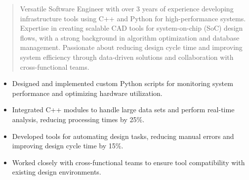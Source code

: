 



\makecvheader

\begin{quote}
  \noindent
  Versatile Software Engineer with over 3 years of experience developing infrastructure tools using C++ and Python for high-performance systems. Expertise in creating scalable CAD tools for system-on-chip (SoC) design flows, with a strong background in algorithm optimization and database management. Passionate about reducing design cycle time and improving system efficiency through data-driven solutions and collaboration with cross-functional teams.
\end{quote}

\par\smallskip
\noindent
\begin{minipage}{20cm}
  \begin{minipage}{9.75cm}
    \begin{itemize}
      \item Designed and implemented custom Python scripts for monitoring system performance and optimizing hardware utilization.
      \item Integrated C++ modules to handle large data sets and perform real-time analysis, reducing processing times by 25\%.
    \end{itemize}
  \end{minipage}
  \hfill
  \begin{minipage}{9.75cm}
    \begin{itemize}
      \item Developed tools for automating design tasks, reducing manual errors and improving design cycle time by 15\%.
      \item Worked closely with cross-functional teams to ensure tool compatibility with existing design environments.
    \end{itemize}
  \end{minipage}
\end{minipage}
\par\smallskip
\divider

